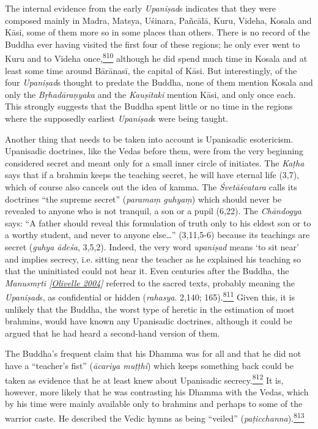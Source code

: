 The internal evidence from the early \emph{Upaniṣad}s indicates that
they were composed mainly in Madra, Matsya, Uśinara, Pañcālā, Kuru,
Videha, Kosala and Kāsi, some of them more so in some places than
others. There is no record of the Buddha ever having visited the first
four of these regions; he only ever went to Kuru and to Videha
once,\label{footprints_split_020.html_fnref810}\hyperref[footprints_split_025.htmlux5cux23fn810]{\textsuperscript{810}}
although he did spend much time in Kosala and at least some time around
Bārānasī, the capital of Kāsi. But interestingly, of the four
\emph{Upaniṣad}s thought to predate the Buddha, none of them mention
Kosala and only the \emph{Bṛhadāraṇyaka} and the \emph{Kauṣītaki}
mention Kāsi, and only once each. This strongly suggests that the Buddha
spent little or no time in the regions where the supposedly earliest
\emph{Upaniṣad}s were being taught.

Another thing that needs to be taken into account is Upanisadic
esotericism. Upanisadic doctrines, like the Vedas before them, were from
the very beginning considered secret and meant only for a small inner
circle of initiates. The \emph{Kaṭha} says that if a brahmin keeps the
teaching secret, he will have eternal life (3,7), which of course also
cancels out the idea of kamma. The \emph{Śvetāśvatara} calls its
doctrines ``the supreme secret'' (\emph{paramaṃ guhyaṃ}) which should
never be revealed to anyone who is not tranquil, a son or a pupil
(6,22). The \emph{Chāndogya} says: ``A father should reveal this
formulation of truth only to his eldest son or to a worthy student, and
never to anyone else\ldots'' (3,11,5-6) because its teachings are secret
(\emph{guhya ādeśa}, 3,5,2). Indeed, the very word \emph{upaniṣad} means
`to sit near' and implies secrecy, i.e. sitting near the teacher as he
explained his teaching so that the uninitiated could not hear it. Even
centuries after the Buddha, the \emph{{Manusmṛti
{{[}\hyperref[footprints_split_022.htmlux5cux23Olivelleux5cux25202004]{Olivelle
2004}{]}}}} referred to the sacred texts, probably meaning the
\emph{Upaniṣad}s, as confidential or hidden (\emph{rahasya}. 2,140;
165).\label{footprints_split_020.html_fnref811}\hyperref[footprints_split_025.htmlux5cux23fn811]{\textsuperscript{811}}
Given this, it is unlikely that the Buddha, the worst type of heretic in
the estimation of most brahmins, would have known any Upanisadic
doctrines, although it could be argued that he had heard a second-hand
version of them.

The Buddha's frequent claim that his Dhamma was for all and that he did
not have a ``teacher's fist'' (\emph{ācariya muṭṭhi}) which keeps
something back could be taken as evidence that he at least knew about
Upanisadic
secrecy.\label{footprints_split_020.html_fnref812}\hyperref[footprints_split_025.htmlux5cux23fn812]{\textsuperscript{812}}
It is, however, more likely that he was contrasting his Dhamma with the
Vedas, which by his time were mainly available only to brahmins and
perhaps to some of the warrior caste. He described the Vedic hymns as
being ``veiled''
(\emph{paṭicchanna}).\label{footprints_split_020.html_fnref813}\hyperref[footprints_split_025.htmlux5cux23fn813]{\textsuperscript{813}}

